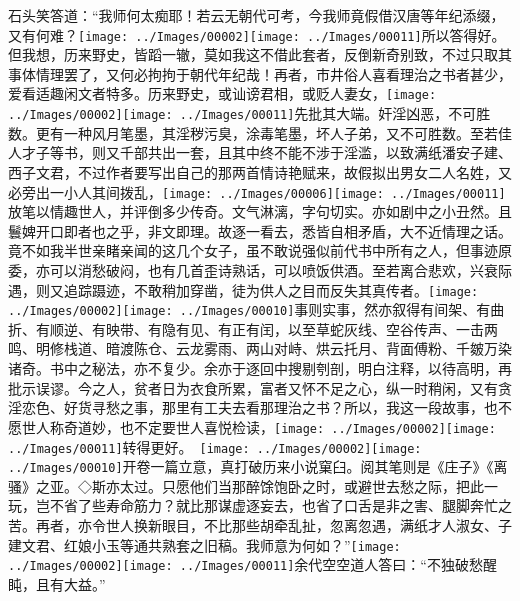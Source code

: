 石头笑答道：``我师何太痴耶！若云无朝代可考，今我师竟假借汉唐等年纪添缀，又有何难？{\texttt{[image: ../Images/00002]}\texttt{[image: ../Images/00011]}\footnotesize \kaishu 所以答得好。}但我想，历来野史，皆蹈一辙，莫如我这不借此套者，反倒新奇别致，不过只取其事体情理罢了，又何必拘拘于朝代年纪哉！再者，市井俗人喜看理治之书者甚少，爱看适趣闲文者特多。历来野史，或讪谤君相，或贬人妻女，{\texttt{[image: ../Images/00002]}\texttt{[image: ../Images/00011]}\footnotesize \kaishu 先批其大端。}奸淫凶恶，不可胜数。更有一种风月笔墨，其淫秽污臭，涂毒笔墨，坏人子弟，又不可胜数。至若佳人才子等书，则又千部共出一套，且其中终不能不涉于淫滥，以致满纸潘安子建、西子文君，不过作者要写出自己的那两首情诗艳赋来，故假拟出男女二人名姓，又必旁出一小人其间拨乱，{\texttt{[image: ../Images/00006]}\texttt{[image: ../Images/00011]}\footnotesize \kaishu 放笔以情趣世人，并评倒多少传奇。文气淋漓，字句切实。}亦如剧中之小丑然。且鬟婢开口即者也之乎，非文即理。故逐一看去，悉皆自相矛盾，大不近情理之话。竟不如我半世亲睹亲闻的这几个女子，虽不敢说强似前代书中所有之人，但事迹原委，亦可以消愁破闷，也有几首歪诗熟话，可以喷饭供酒。至若离合悲欢，兴衰际遇，则又追踪蹑迹，不敢稍加穿凿，徒为供人之目而反失其真传者。{\texttt{[image: ../Images/00002]}\texttt{[image: ../Images/00010]}\footnotesize \kaishu 事则实事，然亦叙得有间架、有曲折、有顺逆、有映带、有隐有见、有正有闰，以至草蛇灰线、空谷传声、一击两鸣、明修栈道、暗渡陈仓、云龙雾雨、两山对峙、烘云托月、背面傅粉、千皴万染诸奇。书中之秘法，亦不复少。余亦于逐回中搜剔刳剖，明白注释，以待高明，再批示误谬。}今之人，贫者日为衣食所累，富者又怀不足之心，纵一时稍闲，又有贪淫恋色、好货寻愁之事，那里有工夫去看那理治之书？所以，我这一段故事，也不愿世人称奇道妙，也不定要世人喜悦检读，{\texttt{[image: ../Images/00002]}\texttt{[image: ../Images/00011]}\footnotesize \kaishu 转得更好。　\texttt{[image: ../Images/00002]}\texttt{[image: ../Images/00010]}\footnotesize \kaishu 开卷一篇立意，真打破历来小说窠臼。阅其笔则是《庄子》《离骚》之亚。◇斯亦太过。}只愿他们当那醉馀饱卧之时，或避世去愁之际，把此一玩，岂不省了些寿命筋力？就比那谋虚逐妄去，也省了口舌是非之害、腿脚奔忙之苦。再者，亦令世人换新眼目，不比那些胡牵乱扯，忽离忽遇，满纸才人淑女、子建文君、红娘小玉等通共熟套之旧稿。我师意为何如？''{\texttt{[image: ../Images/00002]}\texttt{[image: ../Images/00011]}\footnotesize \kaishu 余代空空道人答曰：``不独破愁醒盹，且有大益。''}

